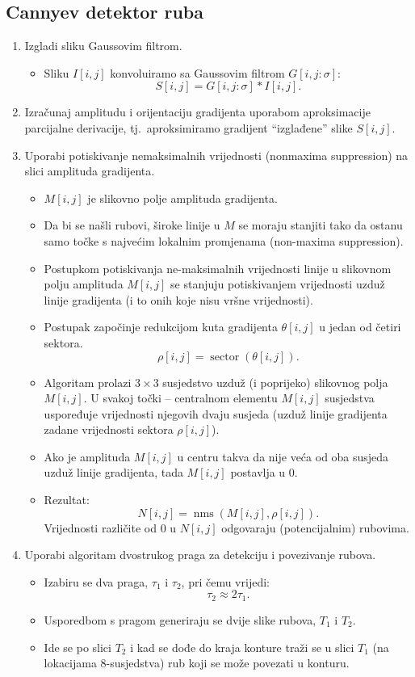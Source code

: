 \documentclass[11pt,english]{article}
\begin{document}
\subsection{Cannyev detektor ruba}
\begin{enumerate}
  \item Izgladi sliku Gaussovim filtrom.
  \begin{itemize}
    \item Sliku $I[i,j]$ konvoluiramo sa Gaussovim filtrom $G[i,j:\sigma]$:
    $$S[i,j] = G[i,j:\sigma] \ast I[i,j].$$
  \end{itemize}
  \item Izračunaj amplitudu i orijentaciju gradijenta uporabom aproksimacije parcijalne derivacije, tj.\ aproksimiramo gradijent ``izglađene'' slike $S[i,j]$.
  \item Uporabi potiskivanje nemaksimalnih vrijednosti (nonmaxima suppression) na slici amplituda gradijenta.
  \begin{itemize}
    \item $M[i,j]$ je slikovno polje amplituda gradijenta.
    \item Da bi se našli rubovi, široke linije u $M$ se moraju stanjiti tako da ostanu samo točke s najvećim lokalnim promjenama (non-maxima suppression).
    \item Postupkom potiskivanja ne-maksimalnih vrijednosti linije u slikovnom polju amplituda $M[i,j]$ se stanjuju potiskivanjem vrijednosti uzduž linije gradijenta (i to onih koje nisu vršne vrijednosti).
    \item Postupak započinje redukcijom kuta gradijenta $\theta[i,j]$ u jedan od četiri sektora.
    $$\rho[i,j] = \operatorname{sector}\left(\theta [i,j]\right ).$$
    \item Algoritam prolazi $3 \times 3$ susjedstvo uzduž (i poprijeko) slikovnog polja $M[i,j]$. U svakoj točki -- centralnom elementu $M[i,j]$ susjedstva uspoređuje vrijednosti njegovih dvaju susjeda (uzduž linije gradijenta zadane vrijednosti sektora $\rho[i,j]$).
    \item Ako je amplituda $M[i,j]$ u centru takva da nije veća od oba susjeda uzduž linije gradijenta, tada $M[i,j]$ postavlja u 0.
    \item Rezultat:
    $$N[i,j] = \operatorname{nms}\left( M[i,j],\rho[i,j]\right).$$
    Vrijednosti različite od 0 u $N[i,j]$ odgovaraju (potencijalnim) rubovima.
  \end{itemize}
  \item Uporabi algoritam dvostrukog praga za detekciju i povezivanje rubova.
  \begin{itemize}
    \item Izabiru se dva praga, $\tau_1$ i $\tau_2$, pri čemu vrijedi:
    $$\tau_2 \approx 2\tau_1.$$
    \item Usporedbom s pragom generiraju se dvije slike rubova, $T_1$ i $T_2$.
    \item Ide se po slici $T_2$ i kad se dođe do kraja konture traži se u slici $T_1$ (na lokacijama 8-susjedstva) rub koji se može povezati u konturu.
  \end{itemize}
\end{enumerate}
\end{document}
